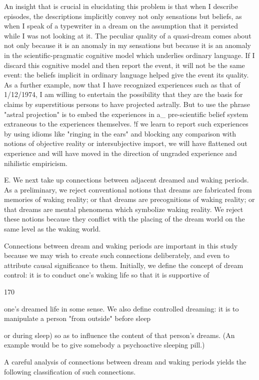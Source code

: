 \documentclass[10pt,twoside]{memoir}
\begin{document}
\begin{enumerate}
{An insight that is crucial in elucidating this problem is that when I 
describe episodes, the descriptions implicitly convey not only sensations but 
beliefs, as when I speak of a typewriter in a dream on the assumption that it 
persisted while I was not looking at it. The peculiar quality of a quasi-dream 
comes about not only because it is an anomaly in my sensations but because 
it is an anomaly in the scientific-pragmatic cognitive model which underlies 
ordinary language. If I discard this cognitive model and then report the 
event, it will not be the same event: the beliefs implicit in ordinary language 
helped give the event its quality. As a further example, now that I have 
recognized experiences such as that of 1/12/1974, I am willing to entertain 
the possibility that they are the basis for claims by superstitious persons to 
have projected astrally. But to use the phrase "astral projection" is to embed 
the experiences in a_ pre-scientific belief system extraneous to the 
experiences themselves. !f we learn to report such experiences by using 
idioms like "ringing in the ears" and blocking any comparison with notions 
of objective reality or intersubjective import, we will have flattened out 
experience and will have moved in the direction of ungraded experience and 
nihilistic empiricism. 

E. We next take up connections between adjacent dreamed and waking 
periods. As a preliminary, we reject conventional notions that dreams are 
fabricated from memories of waking reality; or that dreams are precognitions 
of waking reality; or that dreams are mental phenomena which symbolize 
waking reality. We reject these notions because they conflict with the placing 
of the dream world on the same level as the waking world. 

Connections between dream and waking periods are important in this 
study because we may wish to create such connections deliberately, and even 
to attribute causal significance to them. Initially, we define the concept of 
dream control: it is to conduct one's waking life so that it is supportive of 


170 


one's dreamed life in some sense. We also define controlled dreaming: it is to 
manipulate a person "from outside" before sleep {or during sleep) so as to 
influence the content of that person's dreams. (An example would be to give 
somebody a psychoactive sleeping pill.) 

A careful analysis of connections between dream and waking periods 
yields the following classification of such connections. 

}}
\end{enumerate}
\end{document}
